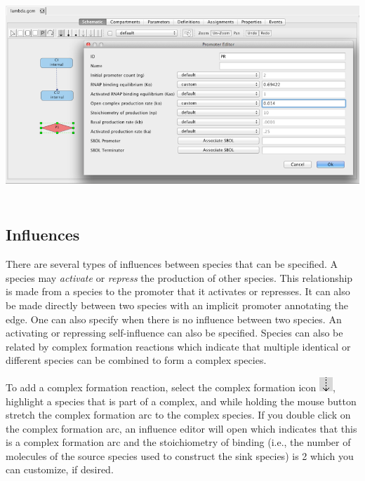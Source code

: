 \documentclass[titlepage,11pt]{article}
\begin{document}
\begin{center}
\includegraphics[height=80mm]{screenshots/promoter}
\end{center}

\subsection{\label{Influences}Influences}

There are several types of influences between species that can be specified.  A species may \emph{activate} or \emph{repress} the production of other species.  This relationship is made from a species to the promoter that it activates or represses.  It can also be made directly between two species with an implicit promoter annotating the edge.  One can also specify when there is no influence between two species.  An activating or repressing self-influence can also be specified.  Species can also be related by complex formation reactions which indicate that multiple identical or different species can be combined to form a complex species.  

To add a complex formation reaction, select the complex formation icon \includegraphics{../gui/icons/modelview/bio_activation_selected}, highlight a species that is part of a complex, and while holding the mouse button stretch the complex formation arc to the complex species.   If you double click on the complex formation arc, an influence editor will open which indicates that this is a complex formation arc and the stoichiometry of binding (i.e., the number of molecules of the source species used to construct the sink species) is 2 which you can customize, if desired.
\end{document}
